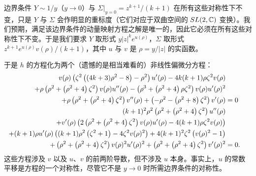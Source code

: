 
边界条件 $Y\sim 1/y$（$y\to 0$）与 $\Sigma|_{y=0}=z^{k+1}/(k+1)$ 在所有这些对称性下不变，只是 $Y$ 与 $\Sigma$ 会作明显的重标度（它们对应于双曲空间的 $SL(2,{\mathbb C})$ 变换）。我们预期，满足该边界条件的动量映射方程之解是唯一的，因此它必须在所有这些对称性下不变。于是我们要求 $Y$ 取形式 $y |z|^k e^{u(\rho)}$，$\Sigma$ 取形式 $z^{k+1}e^{u(\rho)}v(\rho)/(k+1)$，其中 $u$ 与 $v$ 是 $\rho=y/|z|$ 的实函数。



于是 $h$ 的方程化为两个（遗憾的是相当难看的）非线性偏微分方程：
\begin{align}
v(\rho ) \left(\zeta^2 \left((4 k+3) \rho ^2-8\right)-\rho ^2\right) u'(\rho )-4 k (k+1)
   \rho  \zeta^2 v(\rho ) &\cr +\rho  \left(\rho ^2+\left(\rho ^2+4\right) \zeta^2\right) v(\rho )
   u''(\rho )-\left(\rho ^3+\left(\rho ^2+4\right) \rho  \zeta^2\right) v(\rho ) u'(\rho
   )^2 &\cr +\rho  \left(\rho ^2+\left(\rho ^2+4\right) \zeta^2\right) v''(\rho )+\left(-\rho
   ^2-\left(\rho ^2+8\right) \zeta^2\right) v'(\rho ) &=0 \cr 
(k+1)^2 \rho ^2 \left(\rho ^2+\left(\rho ^2+4\right) \zeta^2\right) u''(\rho )& \cr + v'(\rho )
   \left(2 \left(\rho ^2+\left(\rho ^2+4\right) \zeta^2\right) v(\rho ) u'(\rho )-4 (k+1)
   \rho  \zeta^2 v(\rho )\right)& \cr +(k+1) \rho  u'(\rho ) \left((k+1) \rho ^2
   \left(\zeta^2+1\right)-4 \zeta^2 v(\rho )^2\right)+4 (k+1)^2 \zeta^2 \left(v(\rho
   )^2-1\right)&\cr +\left(\rho ^2+\left(\rho ^2+4\right) \zeta^2\right) v(\rho )^2 u'(\rho
   )^2+\left(\rho ^2+\left(\rho ^2+4\right) \zeta^2\right) v'(\rho )^2 &=0. \end{align}
这些方程涉及 $v$ 以及 $u$、$v$ 的前两阶导数，但不涉及 $u$ 本身。事实上，$u$ 的常数平移是方程的一个对称性，尽管它不是 $y \to 0$ 时所需边界条件的对称性。

